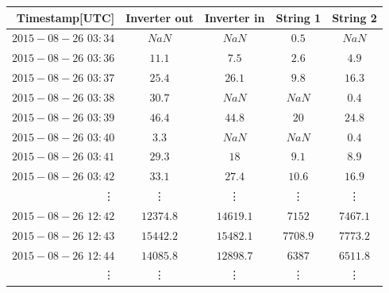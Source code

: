 


\begin{table}[h]

\centering

\begin{tabular}{r|cccc} \hline\hline

Timestamp[UTC] & Inverter out & Inverter in & String 1 & String 2\\ \hline
$2015-08-26$ $03:34$ & $NaN$ & $NaN$ & $0.5$ & $NaN$\\
$2015-08-26$ $03:36$ & $11.1$ & $7.5$ & $2.6$ & $4.9$\\
$2015-08-26$ $03:37$ & $25.4$ & $26.1$ & $9.8$ & $16.3$\\
$2015-08-26$ $03:38$ & $30.7$& $NaN$ & $NaN$ & $0.4$\\
$2015-08-26$ $03:39$ & $46.4$& $44.8$ & $20$ & $24.8$\\
$2015-08-26$ $03:40$ & $3.3$ & $NaN$ & $NaN$ & $0.4$\\
$2015-08-26$ $03:41$ & $29.3$ &  $18$ & $9.1$ & $8.9$\\
$2015-08-26$ $03:42$ & $33.1$& $27.4$ & $10.6$ & $16.9$\\

\vdots & \vdots & \vdots & \vdots & \vdots\\
$2015-08-26$ $12:42$ & $12374.8$ & $14619.1$ & $7152$ & $7467.1$\\
$2015-08-26$ $12:43$ & $15442.2$ & $15482.1 $& $7708.9$ & $7773.2$\\
$2015-08-26$ $12:44$ & $14085.8$ & $12898.7$ & $6387$ & $6511.8$ \\
\vdots & \vdots & \vdots & \vdots & \vdots\\

\hline\hline
\end{tabular}

\label{table_fmi_kumpula_csv}
\end{table}






